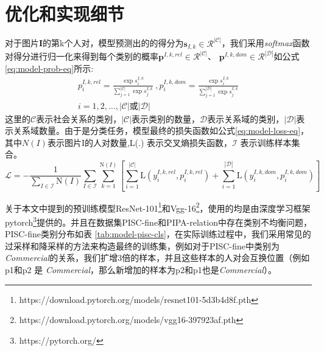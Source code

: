 \section{优化和实现细节}

对于图片\textbf{I}的第k个人对，模型预测出的的得分为$\mathbf{s}_{I,k} \in \mathcal{R}^{|\mathcal{C}|}$，我们采用{\it softmax}函数对得分进行归一化来得到每个类别的概率$\mathbf{p}^{I,k,rel} \in \mathcal{R}^{|\mathcal{C}|}$、
$\mathbf{p}^{I,k,dom} \in \mathcal{R}^{|\mathcal{D}|}$如公式\ref{eq:model-prob-eq}所示:
\begin{equation}
  \label{eq:model-prob-eq}
  \begin{split}
  p_i^{I,k,rel} = \frac{\exp{s_i^{I,k}}}{\sum_{j=1}^{|\mathcal{C}|}{\exp{s_j^{I,k}}}}~, p_i^{I,k,dom} = \frac{\exp{s_i^{I,k}}}{\sum_{j=1}^{|\mathcal{D}|}{\exp{s_j^{I,k}}}} \\
  i=1,2,\dots,|\mathcal{C}|或|\mathcal{D}|
  \end{split}
\end{equation}
这里的$\mathcal{C}$表示社会关系的类别，$|\mathcal{C}|$表示类别的数量，$\mathcal{D}$表示关系域的类别，$|\mathcal{D}|$表示关系域数量。由于是分类任务，模型最终的损失函数如公式\ref{eq:model-loss-eq}，其中$N(I)$表示图片I的人对数量,L(.) 表示交叉熵损失函数，$\mathcal{I}$ 表示训练样本集合。
\begin{equation}
  \label{eq:model-loss-eq}
  \mathcal{L} = - \frac{1}{\sum_{I \in \mathcal{I}}\text{N}(I)} \sum_{I \in \mathcal{I}} \sum_{k=1}^{\text{N}(I)} [ \sum_{i=1}^{|\mathcal{C}|} \text{L}(y_{i}^{I,k,rel}, p_{i}^{I,k,rel}) + \sum_{i=1}^{|\mathcal{D}|}\text{L}(y_{i}^{I,k,dom}, p_{i}^{I,k,dom}) ]
\end{equation}

关于本文中提到的预训练模型ResNet-101\footnote{https://download.pytorch.org/models/resnet101-5d3b4d8f.pth}和Vgg-16\footnote{https://download.pytorch.org/models/vgg16-397923af.pth}，使用的均是由深度学习框架pytorch\footnote{https://pytorch.org/}提供的。并且在数据集PISC-fine和PIPA-relation中存在类别不均衡问题，PISC-fine类别分布如表
\ref{tab:model-pisc-cls}，在实际训练过程中，我们采用常见的过采样和降采样的方法来构造最终的训练集，例如对于PISC-fine中类别为{\it Commercial}的关系，我们扩增3倍的样本，并且这些样本的人对会互换位置（例如p1和p2 是
{\it Commercial}，那么新增加的样本为p2和p1也是{\it Commercial}）。

